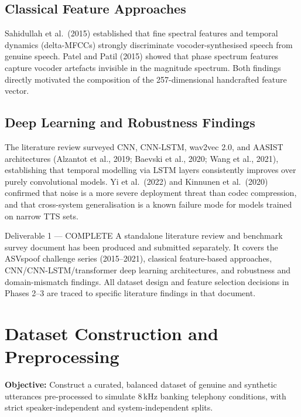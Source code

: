 \documentclass[12pt,a4paper]{report}
\begin{document}
\subsection{Classical Feature Approaches}

Sahidullah et al.\ (2015) established that fine spectral features and temporal dynamics
(delta-MFCCs) strongly discriminate vocoder-synthesised speech from genuine speech.
Patel and Patil (2015) showed that phase spectrum features capture vocoder artefacts
invisible in the magnitude spectrum. Both findings directly motivated the composition of
the 257-dimensional handcrafted feature vector.

\subsection{Deep Learning and Robustness Findings}

The literature review surveyed CNN, CNN-LSTM, wav2vec 2.0, and AASIST architectures
(Alzantot et al., 2019; Baevski et al., 2020; Wang et al., 2021), establishing that
temporal modelling via LSTM layers consistently improves over purely convolutional models.
Yi et al.\ (2022) and Kinnunen et al.\ (2020) confirmed that noise is a more severe
deployment threat than codec compression, and that cross-system generalisation is a known
failure mode for models trained on narrow TTS sets.

\begin{deliverablebox}{Deliverable 1 --- COMPLETE}
  A standalone literature review and benchmark survey document has been produced and
  submitted separately. It covers the ASVspoof challenge series (2015--2021), classical
  feature-based approaches, CNN/CNN-LSTM/transformer deep learning architectures, and
  robustness and domain-mismatch findings. All dataset design and feature selection
  decisions in Phases 2--3 are traced to specific literature findings in that document.
\end{deliverablebox}

\section{Dataset Construction and Preprocessing}

\textbf{Objective:} Construct a curated, balanced dataset of genuine and synthetic
utterances pre-processed to simulate 8\,kHz banking telephony conditions, with strict
speaker-independent and system-independent splits.
\end{document}

